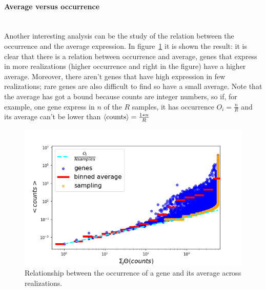 \paragraph{Average versus occurrence}\mbox{}\\
Another interesting analysis can be the study of the relation between the occurrence and the average expression. In figure~\ref{fig:scalinglaws/gtex/meanDiff_binned_sampling} it is shown the result: it is clear that there is a relation between occurrence and average, genes that express in more realizations (higher occurrence and right in the figure) have a higher average. Moreover, there aren't genes that have high expression in few realizations; rare genes are also difficult to find so have a small average. Note that the average has got a bound because counts are integer numbers, so if, for example, one gene express in $n$ of the $R$ samples, it has occurrence $O_i=\frac{n}{R}$ and its average can't be lower than $\left\langle \mathrm{counts}\right\rangle=\frac{1*n}{R}$
\begin{figure}[htb!]
    \centering
    \includegraphics[width=0.9\linewidth]{pictures/scalinglaws/gtex/meanDiff_binned_sampling.png}
    \caption{Relationship between the occurrence of a gene and its average across realizations.}
    \label{fig:scalinglaws/gtex/meanDiff_binned_sampling}
\end{figure}

